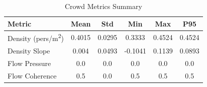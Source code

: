\begin{table}[t]
\centering
\caption{Crowd Metrics Summary}
\label{tab:metrics}
\begin{tabular}{lccccc}
\toprule
\textbf{Metric} & \textbf{Mean} & \textbf{Std} & \textbf{Min} & \textbf{Max} & \textbf{P95} \\
\midrule
        Density (pers/m\textsuperscript{2}) & 0.4015 & 0.0295 & 0.3333 & 0.4524 & 0.4524 \\
        Density Slope & 0.004 & 0.0493 & -0.1041 & 0.1139 & 0.0893 \\
        Flow Pressure & 0.0 & 0.0 & 0.0 & 0.0 & 0.0 \\
        Flow Coherence & 0.5 & 0.0 & 0.5 & 0.5 & 0.5 \\
\bottomrule
\end{tabular}
\end{table}
